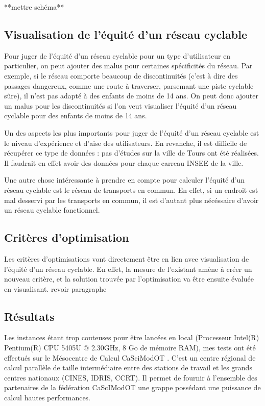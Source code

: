 \documentclass[a4paper,12pt,french]{article}
\begin{document}
**mettre schéma**


\subsection{Visualisation de l'équité d'un réseau cyclable}

Pour juger de l'équité d'un réseau cyclable pour un type d'utilisateur en particulier, on peut ajouter des malus pour certaines spécificités du réseau. Par exemple, si le réseau comporte beaucoup de discontinuités (c'est à dire des passages dangereux, comme une route à traverser, parsemant une piste cyclable sûre), il n'est pas adapté à des enfants de moins de 14 ans. On peut donc ajouter un malus pour les discontinuités si l'on veut visualiser l'équité d'un réseau cyclable pour des enfants de moins de 14 ans.

Un des aspects les plus importants pour juger de l'équité d'un réseau cyclable est le niveau d'expérience et d'aise des utilisateurs. En revanche, il est difficile de récupérer ce type de données : pas d'études sur la ville de Tours ont été réalisées. Il faudrait en effet avoir des données pour chaque carreau INSEE de la ville.

Une autre chose intéressante à prendre en compte pour calculer l'équité d'un réseau cyclable est le réseau de transports en commun. En effet, si un endroit est mal desservi par les transports en commun, il est d'autant plus nécéssaire d'avoir un réseau cyclable fonctionnel. 




\subsection{Critères d'optimisation}

Les critères d'optimisations vont directement être en lien avec visualisation de l'équité d'un réseau cyclable. En effet, la mesure de l'existant amène à créer un nouveau critère, et la solution trouvée par l'optimisation va être ensuite évaluée en visualisant. revoir paragraphe

\subsection{Résultats}

Les instances étant trop couteuses pour être lancées en local (Processeur Intel(R) Pentium(R) CPU 5405U @ 2.30GHz, 8 Go de mémoire RAM), mes tests ont été effectués sur le Mésocentre de Calcul CaSciModOT \cite{cas}. C'est un centre régional de calcul parallèle de taille intermédiaire entre des stations de travail et les grands centres nationaux (CINES, IDRIS, CCRT). Il permet de fournir à l'ensemble des partenaires de la fédération CaScIModOT une grappe possédant une puissance de calcul hautes performances.
\end{document}
